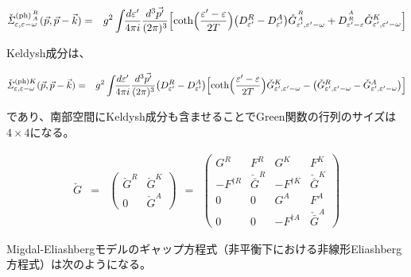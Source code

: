 \documentclass[uplatex,a4j,12pt,dvipdfmx]{jsarticle}
\begin{document}
\begin{eqnarray}
	\check{\mathit{\Sigma}}^{{(\rm ph)} {{R}\atop{A}} }_{\varepsilon , \varepsilon - \omega} (\vec{p} , \vec{p} - \vec{k})
	&=&
	g^{2} \int \!\! \dfrac{d \varepsilon'}{4 \pi i} \dfrac{d^{3} \vec{p'}}{ (2 \pi)^{3}}
	\Big[
		{\rm coth} \Big( \dfrac{ \varepsilon' - \varepsilon }{2T} \Big)
		\big( D^{R}_{\varepsilon'} - D^{A}_{\varepsilon'} \big)
		\check{G}^{ {{R}\atop{A}} }_{ \varepsilon' , \varepsilon'- \omega }
		+
		D^{ {{A}\atop{R}} }_{\varepsilon' - \varepsilon} \check{G}^{K}_{ \varepsilon' , \varepsilon'- \omega }
		\Big]
\end{eqnarray}

Keldysh成分は、

\begin{eqnarray}
	\check{\mathit{\Sigma}}^{{(\rm ph)} K }_{\varepsilon , \varepsilon - \omega} (\vec{p} , \vec{p} - \vec{k})
	&=&
	g^{2} \int \!\! \dfrac{d \varepsilon'}{4 \pi i} \dfrac{d^{3} \vec{p'}}{ (2 \pi)^{3}}
	\big( D^{R}_{\varepsilon'} - D^{A}_{\varepsilon'} \big)
	\Big[
		{\rm coth} \Big( \dfrac{ \varepsilon' - \varepsilon }{2T} \Big)
		\check{G}^{K}_{ \varepsilon' , \varepsilon'- \omega }
		-
		\big( \check{G}^{R}_{ \varepsilon' , \varepsilon'- \omega } - \check{G}^{A}_{ \varepsilon' , \varepsilon'- \omega } \big)
		\Big]
\end{eqnarray}

であり、南部空間にKeldysh成分も含ませることでGreen関数の行列のサイズは$4 \times 4$になる。

\begin{eqnarray}
	\breve{G}
	&=&
	\left(
	\begin{array}{cc}
			\check{G}^{R} & \check{G}^{K}
			\\
			0             & \check{G}^{A}
		\end{array}
	\right)
	\ \ = \ \
	\left(
	\begin{array}{cccc}
			G^{R}           & F^{R}               & G^{K}           & F^{K}
			\\
			- F^{\dagger R} & \check{\bar{G}}^{R} & - F^{\dagger K} & \check{\bar{G}}^{K}
			\\
			0               & 0                   & G^{A}           & F^{A}
			\\
			0               & 0                   & - F^{\dagger A} & \check{\bar{G}}^{A}
		\end{array}
	\right)
\end{eqnarray}

Migdal-Eliashbergモデルのギャップ方程式（非平衡下における非線形Eliashberg方程式）は次のようになる。
\end{document}
